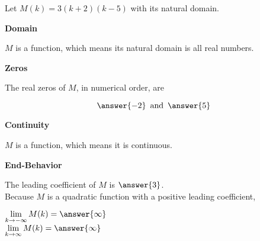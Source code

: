 \documentclass{ximera}
\author{Lee Wayand}
\begin{document}
\begin{exercise} 




Let $M(k) = 3(k+2)(k-5)$ with its natural domain. \\




\begin{question}  \textbf{\textcolor{blue!55!black}{Domain}}


$M$ is a  function, which means its natural domain is all real numbers.

\end{question}








\begin{question}  \textbf{\textcolor{blue!55!black}{Zeros}}


The real zeros of $M$, in numerical order, are

\[
\answer{-2} \, \text{ and } \, \answer{5}
\]

\end{question}







\begin{question}  \textbf{\textcolor{blue!55!black}{Continuity}}


$M$ is a  function, which means it is continuous.

\end{question}









\begin{question}  \textbf{\textcolor{blue!55!black}{End-Behavior}}


The leading coefficient of $M$ is $\answer{3}$. \\


Because $M$ is a quadratic function with a positive leading coefficient,

$\lim\limits_{k \to -\infty} M(k) = \answer{\infty}$ \\


$\lim\limits_{k \to \infty} M(k) = \answer{\infty}$ \\


\end{question}
\end{exercise}
\end{document}
